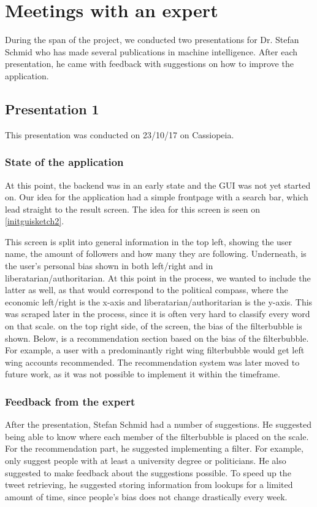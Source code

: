 \section{Meetings with an expert} \label{expMeeting}
During the span of the project, we conducted two presentations for Dr. Stefan
Schmid who has made several publications in machine intelligence. After
each presentation, he came with feedback with suggestions on how to improve the
application. 
\subsection{Presentation 1}
This presentation was conducted on 23/10/17 on Cassiopeia. 
\subsubsection{State of the application}
At this point, the backend was in an early state and the \ac{GUI} was not yet
started on. Our idea for the application had a simple frontpage with a search
bar, which lead straight to the result screen. The idea for this screen is seen
on \autoref{initguisketch2}.


This screen is split into general information in the top left, showing the user
name, the amount of followers and how many they are following. Underneath, is
the user's personal bias shown in both left/right and in
liberatarian/authoritarian. At this point in the process, we wanted to include
the latter as well, as that would correspond to the political compass, where the
economic left/right is the x-axis and liberatarian/authoritarian is the y-axis.
This was scraped later in the process, since it is often very hard to classify
every word on that scale. on the top right side, of the screen, the bias of the
filterbubble is shown. Below, is a recommendation section based on the bias of
the filterbubble. For example, a user with a predominantly right wing
filterbubble would get left wing accounts recommended. The recommendation system
was later moved to future work, as it was not possible to implement it within
the timeframe. 

\subsubsection{Feedback from the expert}
After the presentation, Stefan Schmid had a number of suggestions. He suggested
being able to know where each member of the filterbubble is placed on the scale.
For the recommendation part, he suggested implementing a filter. For example,
only suggest people with at least a university degree or politicians. 
He also suggested to make feedback about the suggestions possible.
To speed up the tweet retrieving, he suggested storing information from lookups
for a limited amount of time, since people's bias does not change drastically
every week. 

